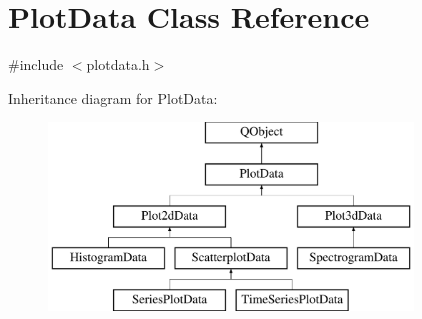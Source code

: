 \hypertarget{class_plot_data}{\section{Plot\-Data Class Reference}
\label{class_plot_data}
}


{\ttfamily \#include $<$plotdata.\-h$>$}

Inheritance diagram for Plot\-Data\-:\begin{figure}[H]
\begin{center}
\leavevmode
\includegraphics[height=5.000000cm]{class_plot_data}
\end{center}
\end{figure}
